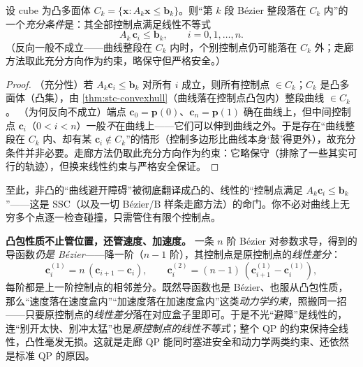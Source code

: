 \begin{theorem}[凸包性质把安全约束线性化]\label{thm:stc-safety-linear}
设 cube 为凸多面体 $C_k=\{\mathbf{x}:A_k\mathbf{x}\le\mathbf{b}_k\}$。则“第 $k$ 段 Bézier 整段落在 $C_k$ 内”的一个\emph{充分条件}是：其全部控制点满足线性不等式
\begin{equation}
  A_k\,\mathbf{c}_i\le\mathbf{b}_k,\qquad i=0,1,\dots,n.
  \label{eq:stc-safety}
\end{equation}
（反向一般不成立——曲线整段在 $C_k$ 内时，个别控制点仍可能落在 $C_k$ 外；走廊方法取此充分方向作为约束，略保守但严格安全。）
\end{theorem}
\begin{proof}
（充分性）若 $A_k\mathbf{c}_i\le\mathbf{b}_k$ 对所有 $i$ 成立，则所有控制点 $\in C_k$；$C_k$ 是凸多面体（凸集），由 \cref{thm:stc-convexhull}（曲线落在控制点凸包内）整段曲线 $\in C_k$。
（为何反向不成立）端点 $\mathbf{c}_0=\mathbf{p}(0)$、$\mathbf{c}_n=\mathbf{p}(1)$ 确在曲线上，但中间控制点 $\mathbf{c}_i$（$0<i<n$）一般\emph{不}在曲线上——它们可以伸到曲线之外。于是存在“曲线整段在 $C_k$ 内、却有某 $\mathbf{c}_i\notin C_k$”的情形（控制多边形比曲线本身‘鼓’得更外），故充分条件并非必要。走廊方法仍取此充分方向作为约束：它略保守（排除了一些其实可行的轨迹），但换来线性约束与严格安全保证。
\end{proof}

\noindent 至此，非凸的“曲线避开障碍”被彻底翻译成凸的、线性的“控制点满足 $A_k\mathbf{c}_i\le\mathbf{b}_k$”——这是 SSC（以及一切 Bézier/B 样条走廊方法）的命门。你不必对曲线上无穷多个点逐一检查碰撞，只需管住有限个控制点。

\begin{insight}
\textbf{凸包性质不止管位置，还管速度、加速度。}\;
一条 $n$ 阶 Bézier 对参数求导，得到的导函数\emph{仍是 Bézier}——降一阶（$n-1$ 阶），其控制点是原控制点的\emph{线性差分}：
\begin{equation}
  \mathbf{c}_i^{(1)}=n\,(\mathbf{c}_{i+1}-\mathbf{c}_i),\qquad
  \mathbf{c}_i^{(2)}=(n-1)\,(\mathbf{c}_{i+1}^{(1)}-\mathbf{c}_i^{(1)}),
  \label{eq:stc-deriv-ctrl}
\end{equation}
每阶都是上一阶控制点的相邻差分。既然导函数也是 Bézier、也服从凸包性质，那么“速度落在速度盒内”“加速度落在加速度盒内”这类\emph{动力学约束}，照搬同一招——只要原控制点的\emph{线性差分}落在对应盒子里即可。于是不光“避障”是线性的，连“别开太快、别冲太猛”也是\emph{原控制点的线性不等式}；整个 QP 的约束保持全线性，凸性毫发无损。这就是走廊 QP 能同时塞进安全和动力学两类约束、还依然是标准 QP 的原因。
\end{insight}

